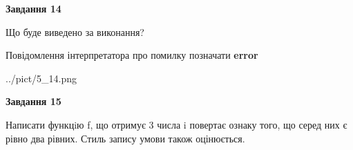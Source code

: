 \documentclass[11pt, ukrainian]{article}
\begin{document}
{\begin {large}
{\begin {center}\textbf{Завдання 14}\end {center}}\par
Що буде виведено за виконання? \par
Повідомлення інтерпретатора про помилку позначати \textbf{error}

\begin{center}
	{../pict/5_14.png}
\end{center}
\newpage

{\begin {center}\textbf{Завдання 15}\end {center}}\par

Написати функцiю f, що отримує 3 числа i повертає ознаку того, що серед них є рівно два рівних. Стиль запису умови також оцінюється.\par
\newpage

\end {large}}
\end{document}
